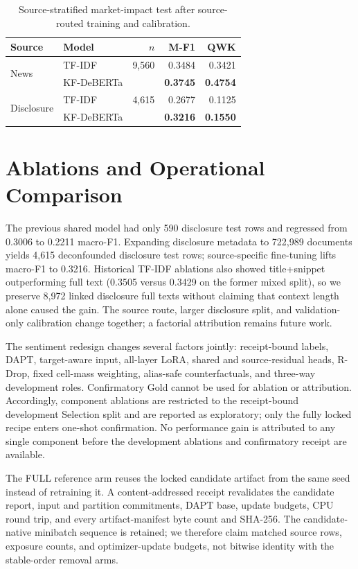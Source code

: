\documentclass[11pt]{article}
\begin{document}
\begin{table}[t]
\centering
\scriptsize
\begin{tabular}{@{}llrrr@{}}
\toprule
Source & Model & $n$ & M-F1 & QWK \\
\midrule
\multirow{2}{*}{News} & TF-IDF & 9,560 & 0.3484 & 0.3421 \\
 & KF-DeBERTa & & \textbf{0.3745} & \textbf{0.4754} \\
\multirow{2}{*}{Disclosure} & TF-IDF & 4,615 & 0.2677 & 0.1125 \\
 & KF-DeBERTa & & \textbf{0.3216} & \textbf{0.1550} \\
\bottomrule
\end{tabular}
\caption{Source-stratified market-impact test after source-routed training and calibration.}
\label{tab:source}
\end{table}

\section{Ablations and Operational Comparison}

The previous shared model had only 590 disclosure test rows and regressed from 0.3006 to 0.2211 macro-F1. Expanding disclosure metadata to 722,989 documents yields 4,615 deconfounded disclosure test rows; source-specific fine-tuning lifts macro-F1 to 0.3216. Historical TF-IDF ablations also showed title+snippet outperforming full text (0.3505 versus 0.3429 on the former mixed split), so we preserve 8,972 linked disclosure full texts without claiming that context length alone caused the gain. The source route, larger disclosure split, and validation-only calibration change together; a factorial attribution remains future work.

The sentiment redesign changes several factors jointly: receipt-bound labels, DAPT, target-aware input, all-layer LoRA, shared and source-residual heads, R-Drop, fixed cell-mass weighting, alias-safe counterfactuals, and three-way development roles. Confirmatory Gold cannot be used for ablation or attribution. Accordingly, component ablations are restricted to the receipt-bound development Selection split and are reported as exploratory; only the fully locked recipe enters one-shot confirmation. No performance gain is attributed to any single component before the development ablations and confirmatory receipt are available.

The FULL reference arm reuses the locked candidate artifact from the same seed instead of retraining it. A content-addressed receipt revalidates the candidate report, input and partition commitments, DAPT base, update budgets, CPU round trip, and every artifact-manifest byte count and SHA-256. The candidate-native minibatch sequence is retained; we therefore claim matched source rows, exposure counts, and optimizer-update budgets, not bitwise identity with the stable-order removal arms.
\end{document}
